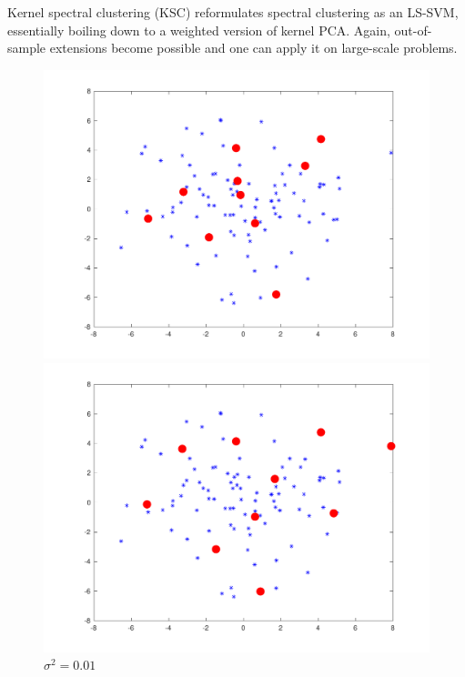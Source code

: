 \par Kernel spectral clustering (KSC) reformulates spectral clustering as an LS-SVM, essentially boiling down to a weighted version of kernel PCA. Again, out-of-sample extensions become possible and one can apply it on large-scale problems. 

\begingroup
\setlength{\columnsep}{0.8cm}
\setlength{\intextsep}{0.5cm}
\begin{figure}
\vspace{-1.0cm}
\begin{minipage}{\linewidth}
    \centering\captionsetup[subfigure]{justification=centering}
    \includegraphics[width=\linewidth]{../src/figures/fixedsize/fixedsize_1}
    \caption*{$\sigma^2=0.01$}
\includegraphics[width=\linewidth]{../src/figures/fixedsize/fixedsize_10}

\end{minipage}
\end{figure}
